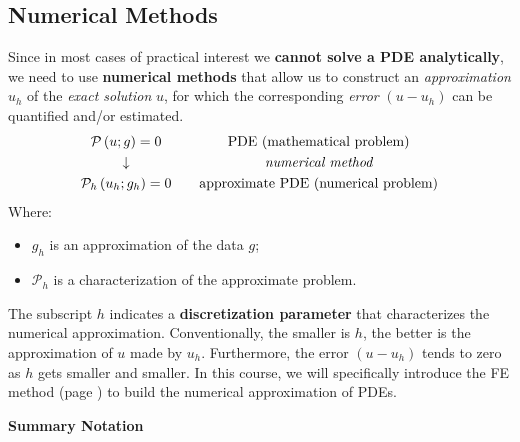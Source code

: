 \subsection{Numerical Methods}

Since in most cases of practical interest we \textbf{cannot solve a PDE analytically}, we need to use \textbf{numerical methods} that allow us to construct an \emph{approximation} $u_{h}$ of the \emph{exact solution} $u$, for which the corresponding \emph{error} $\left(u - u_{h}\right)$ can be quantified and/or estimated.
\begin{equation*}
    \begin{array}{cc}
        \mathcal{P}\left(u; g\right) = 0 \hspace{1em} & \text{PDE (mathematical problem)} \\ [.3em]
        \downarrow \hspace{1em} & \emph{numerical method} \\ [.3em]
        \mathcal{P}_{h}\left(u_{h}; g_{h}\right) = 0 \hspace{1em} & \text{approximate PDE (numerical problem)}
    \end{array}
\end{equation*}
Where:
\begin{itemize}
    \item $g_{h}$ is an approximation of the data $g$;
    \item $\mathcal{P}_{h}$ is a characterization of the approximate problem.
\end{itemize}
The subscript $h$ indicates a \textbf{discretization parameter} that characterizes the numerical approximation. Conventionally, the smaller is $h$, the better is the approximation of $u$ made by $u_{h}$. Furthermore, the error $\left(u - u_{h}\right)$ tends to zero as $h$ gets smaller and smaller. In this course, we will specifically introduce the FE method (page \pageref{definition: Finite Element Method (FEM)}) to build the numerical approximation of PDEs.

\highspace
\begin{flushleft}
    \textcolor{Green3}{ \textbf{Summary Notation}}
\end{flushleft}

